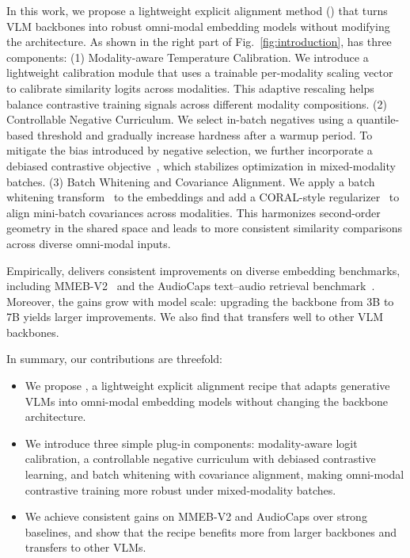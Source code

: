 In this work, we propose a lightweight explicit alignment method (\ours{}) that turns VLM backbones into robust omni-modal embedding models without modifying the architecture.
As shown in the right part of Fig.~\ref{fig:introduction}, \ours{} has three components:
(1) Modality-aware Temperature Calibration.
We introduce a lightweight calibration module that uses a trainable per-modality scaling vector to calibrate similarity logits across modalities.
This adaptive rescaling helps balance contrastive training signals across different modality compositions.
(2) Controllable Negative Curriculum.
We select in-batch negatives using a quantile-based threshold and gradually increase hardness after a warmup period.
To mitigate the bias introduced by negative selection, we further incorporate a debiased contrastive objective~\citep{dcl}, which stabilizes optimization in mixed-modality batches.
(3) Batch Whitening and Covariance Alignment.
We apply a batch whitening transform~\citep{Whiten} to the embeddings and add a CORAL-style regularizer~\citep{coral} to align mini-batch covariances across modalities.
This harmonizes second-order geometry in the shared space and leads to more consistent similarity comparisons across diverse omni-modal inputs.



Empirically, \ours{} delivers consistent improvements on diverse embedding benchmarks, including MMEB-V2~\citep{MMEB-v2} and the AudioCaps text--audio retrieval benchmark~\citep{AudioCaps}.
Moreover, the gains grow with model scale: upgrading the backbone from 3B to 7B yields larger improvements.
We also find that \ours{} transfers well to other VLM backbones.

\smallskip
In summary, our contributions are threefold:
\begin{itemize}
\item We propose \ours{}, a lightweight explicit alignment recipe that adapts generative VLMs into omni-modal embedding models without changing the backbone architecture.
\item We introduce three simple plug-in components: modality-aware logit calibration, a controllable negative curriculum with debiased contrastive learning, and batch whitening with covariance alignment, making omni-modal contrastive training more robust under mixed-modality batches.
\item We achieve consistent gains on MMEB-V2 and AudioCaps over strong baselines, and show that the recipe benefits more from larger backbones and transfers to other VLMs.
\end{itemize}





